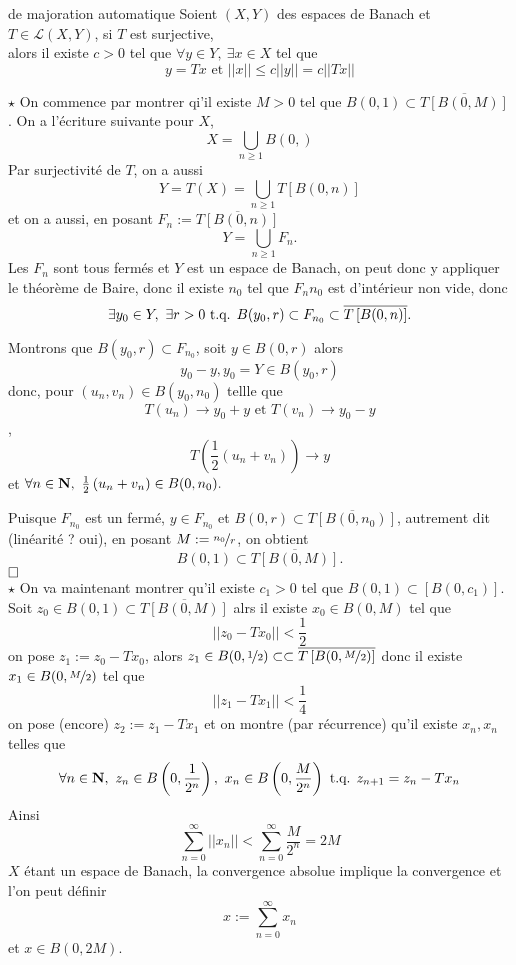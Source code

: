 \documentclass[a4paper,11pt, twoside]{article}
\begin{document}
\begin{thC}{de majoration automatique}
  Soient $(X,Y)$ des espaces de Banach et $T\in\mathcal L(X,Y)$, si $T$ est surjective,\\

  alors il existe $c>0$ tel que $\forall y\in Y,\ \exists x\in X$ tel que
  $$y=Tx\text{ et }||x||\leqslant c||y||=c||Tx||$$
\end{thC}


\begin{Proof}
  $\star$ On commence par montrer qi'il existe $M>0$ tel que $B(0,1)\subset \overline{T\left[B(0,M)\right]}$. On a l'écriture suivante pour $X$,
  $$X=\bigcup_{n\geqslant 1}B(0,)$$
  Par surjectivité de $T$, on a aussi
  $$Y=T(X)=\bigcup_{n\geqslant 1}T\left[B(0,n)\right]$$
  et on a aussi, en posant $F_n:=\overline{T\left[B(0,n)\right]}$
  $$Y=\bigcup_{n\geqslant 1}F_n.$$
  Les $F_n$ sont tous fermés et $Y$ est un espace de Banach, on peut donc y appliquer le théorème de Baire, donc il existe $n_0$ tel que $F_n{n_0}$ est d'intérieur non vide, donc
  $$\exists y_0\in Y,\ \exists r>0\text{ t.q. } B(y_0,r)\subset F_{n_0}\subset \overline{T\left[B(0,n)\right]}.$$

  Montrons que $B(y_0,r)\subset F_{n_0}$, soit $y\in B(0,r)$ alors 
  $$y_0-y,y_0=Y\in B(y_0,r)$$
  donc, pour $(u_n,v_n)\in B(y_0,n_0)$ tellle que 
  $$T(u_n)\longrightarrow y_0+y\text{ et }T(v_n)\longrightarrow y_0-y$$,
  $$T\left(\frac12\left(u_n+v_n\right)\right)\longrightarrow y$$
  et $\forall n\in\N,\ \frac12\left(u_n+v_n\right)\in B(0,n_0).$

  Puisque $F_{n_0}$ est un fermé, $y\in F_{n_0}$ et $B(0,r)\subset\overline{T\left[B(0,n_0)\right]}$, autrement dit (linéarité ? oui), en posant $M:=\nicefrac{n_0}{r}$, on obtient 
  $$B(0,1)\subset \overline{T\left[B(0,M)\right]}.$$
  $\hfill\square$\\

  $\star$ On va maintenant montrer qu'il existe $c_1>0$ tel que $B(0,1)\subset\left[B(0,c_1)\right].$ Soit $z_0\in B(0,1)\subset \overline{T\left[B(0,M)\right]}$ alrs il existe $x_0\in B(0,M)$ tel que
  $$||z_0-Tx_0||<\frac12$$
  on pose $z_1:=z_0-Tx_0$, alors $z_1\in B(0,\nicefrac12)\subset \subset \overline{T\left[B(0,\nicefrac{M}{2})\right]}$ donc il existe $x_1\in B(0,\nicefrac{M}{2})$ tel que 
  $$||z_1-Tx_1||<\frac14$$
  on pose (encore) $z_2:=z_1-Tx_1$ et on montre (par récurrence) qu'il existe $x_n,x_n$ telles que 
  $$\forall n\in \mathbf N,\ z_n\in B\left(0,\frac{1}{2^n}\right),\ x_n\in B\left(0,\frac{M}{2^n}\right)\text{ t.q. } z_{n+1}=z_n-Tx_n$$
  Ainsi 
  $$\sum_{n=0}^\infty ||x_n||<\sum_{n=0}^\infty\frac{M}{2^n}=2M$$
  $X$ étant un espace de Banach, la convergence absolue implique la convergence et l'on peut définir 
  $$x:=\sum_{n=0}^\infty x_n$$
  et $x\in B(0,2M)$.


\end{Proof}
\end{document}
